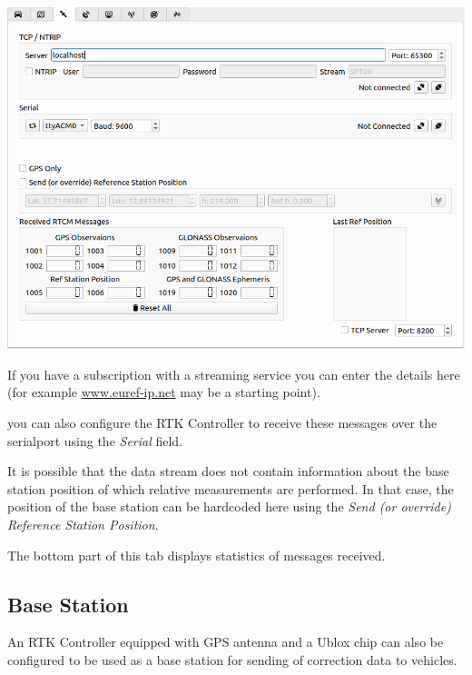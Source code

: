 \documentclass[12pt]{article} %
\begin{document}
\noindent\begin{minipage}{0.5\linewidth} 
\noindent \includegraphics[width=\textwidth]{./screens/RTCM_client.png}
\end{minipage}
\begin{minipage}{0.5\linewidth}
  If you have a subscription with a streaming service
  you can enter the details here (for example \url{www.euref-ip.net} may be a starting point).

you can also configure the RTK Controller to receive these messages
over the serialport using the {\em Serial} field.

It is possible that the data stream does not contain information about
the base station position of which relative measurements are
performed. In that case, the position of the base station can be
hardcoded here using the {\em Send (or override) Reference Station
  Position}.
\end{minipage}
The bottom part of this tab displays statistics of messages received.  

\subsection{Base Station}


An RTK Controller equipped with GPS antenna and a Ublox chip can also be configured
to be used as a base station for sending of correction data to vehicles. 
\end{document}

